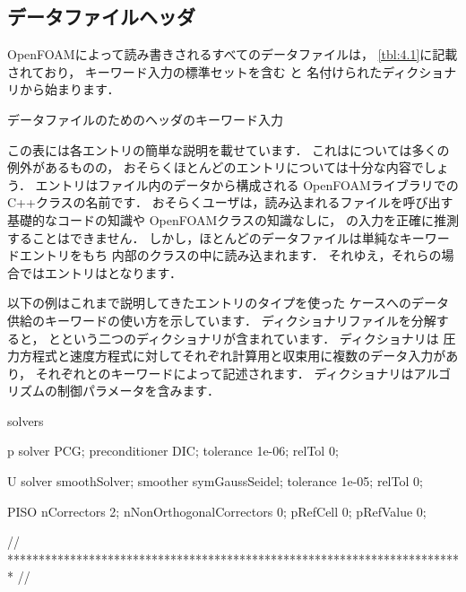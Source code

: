 \subsection{データファイルヘッダ}
\label{ssec:4.2.3}
OpenFOAMによって読み書きされるすべてのデータファイルは，
\autoref{tbl:4.1}に記載されており，
キーワード入力の標準セットを含む
%
%
と
名付けられたディクショナリから始まります．


\begin{table}[ht]
 
 \caption{データファイルのためのヘッダのキーワード入力}
 \label{tbl:4.1}
\end{table}


この表には各エントリの簡単な説明を載せています．
これはについては多くの例外があるものの，
おそらくほとんどのエントリについては十分な内容でしょう．
エントリはファイル内のデータから構成される
OpenFOAMライブラリでのC++クラスの名前です．
おそらくユーザは，読み込まれるファイルを呼び出す基礎的なコードの知識や
OpenFOAMクラスの知識なしに，
の入力を正確に推測することはできません．
しかし，ほとんどのデータファイルは単純なキーワードエントリをもち
内部のクラスの中に読み込まれます．
それゆえ，それらの場合ではエントリはとなります．

以下の例はこれまで説明してきたエントリのタイプを使った
ケースへのデータ供給のキーワードの使い方を示しています．
ディクショナリファイルを分解すると，
とという二つのディクショナリが含まれています．
ディクショナリは
圧力方程式と速度方程式に対してそれぞれ計算用と収束用に複数のデータ入力があり，
それぞれとのキーワードによって記述されます．
ディクショナリはアルゴリズムの制御パラメータを含みます．
\begin{OFverbatim}[file, linenum=17]

solvers
{
    p
    {
        solver           PCG;
        preconditioner   DIC;
        tolerance        1e-06;
        relTol           0;
    }

    U
    {
        solver           smoothSolver;
        smoother         symGaussSeidel;
        tolerance        1e-05;
        relTol           0;
    }
}

PISO
{
    nCorrectors     2;
    nNonOrthogonalCorrectors 0;
    pRefCell        0;
    pRefValue       0;
}


// ************************************************************************* //
\end{OFverbatim}


